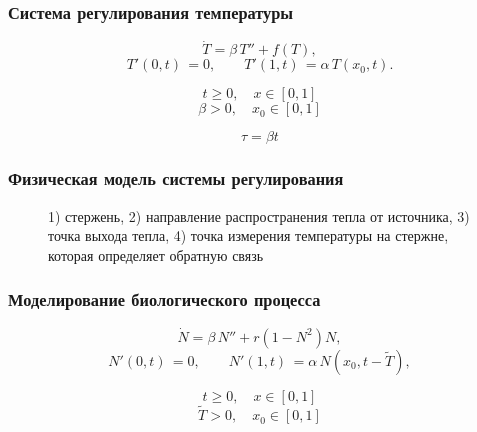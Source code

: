 \documentclass[fullscreen=true, unicode, bookmarks=false]{beamer}
\begin{document}
\begin{frame}
\frametitle{ Система регулирования температуры }
 
\begin{equation}
\dot{T} = \beta \, T'' + f(T),
\end{equation}
\begin{equation}
T'(0, t) \, = 0, \qquad T'(1, t) \, = \alpha\,T(x_0, t).
\end{equation}

$$ t \geqslant 0, \quad x \in [0,1] $$
$$ \beta > 0, \quad x_0 \in [0, 1] $$

\bigskip

$$ \tau = \beta t $$

\end{frame}

\begin{frame}
\frametitle{  Физическая модель системы регулирования}

\begin{figure}[ht]
\begin{minipage}[h]{0.99\linewidth}
\end{minipage}
1) стержень, 2) направление распространения тепла от источника, 3) точка выхода тепла, 4) точка измерения температуры на стержне, которая определяет обратную связь
\end{figure}

\end{frame}

\begin{frame}
\frametitle{ Моделирование биологического процесса }

\begin{equation}
\dot{N} = \beta \, N'' + r(1 - N^2)N,
\end{equation}
\begin{equation}
N'(0, t) \, = 0, \qquad N'(1, t) \, = \alpha\,N(x_0, t-\tilde{T}),
\end{equation}

$$ t \geqslant 0, \quad x \in [0,1] $$
$$ \tilde{T} > 0, \quad x_0 \in [0, 1] $$

\end{frame}
\end{document}
